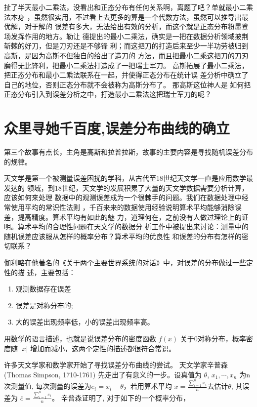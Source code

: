 扯了半天最小二乘法，没看出和正态分布有任何关系啊，离题了吧？单就最小二乘法本身
，虽然很实用，不过看上去更多的算是一个代数方法，虽然可以推导出最优解，对于解的
误差有多大，无法给出有效的分析，而这个就是正态分布粉墨登场发挥作用的地方。勒让
德提出的最小二乘法，确实是一把在数据分析领域披荆斩棘的好刀，但是刀刃还是不够锋
利；而这把刀的打造后来至少一半功劳被归到高斯，是因为高斯不但独自的给出了造刀的
方法，而且把最小二乘这把刀的刀刃磨得无比锋利，把最小二乘法打造成了一把瑞士军刀。
高斯拓展了最小二乘法，把正态分布和最小二乘法联系在一起，并使得正态分布在统计误
差分析中确立了自己的地位，否则正态分布就不会被称为高斯分布了。 那高斯这位神人是
如何把正态分布引入到误差分析之中，打造最小二乘法这把瑞士军刀的呢？

\section{众里寻她千百度,误差分布曲线的确立}

第三个故事有点长，主角是高斯和拉普拉斯，故事的主要内容是寻找随机误差分布的规律。

天文学是第一个被测量误差困扰的学科，从古代至18世纪天文学一直是应用数学最发达的
领域，到18世纪，天文学的发展积累了大量的天文学数据需要分析计算，应该如何来处理
数据中的观测误差成为一个很棘手的问题。我们在数据处理中经常使用平均的常识性法则
，千百来来的数据使用经验说明算术平均能够消除误差，提高精度。算术平均有如此的魅
力，道理何在，之前没有人做过理论上的证明。算术平均的合理性问题在天文学的数据分
析工作中被提出来讨论：测量中的随机误差应该服从怎样的概率分布？算术平均的优良性
和误差的分布有怎样的密切联系？

伽利略在他著名的《关于两个主要世界系统的对话》中，对误差的分布做过一些定性的描
述，主要包括：
\begin{enumerate}
\item 观测数据存在误差
\item 误差是对称分布的;
\item 大的误差出现频率低，小的误差出现频率高。
\end{enumerate}
用数学的语言描述，也就是说误差分布的密度函数 $f(x)$ 关于0对称分布，概率密度随
$|x|$ 增加而减小，这两个定性的描述都很符合常识。

许多天文学家和数学家开始了寻找误差分布曲线的尝试。 天文学家辛普森(Thomas
Simpson, 1710-1761) 先走出了有意义的一步。设真值为 $\theta$, $x_1, \cdots, x_n$
为n次测量值, 每次测量的误差为$ e_i = x_i - \theta $，若用算术平均 $\overline{x} =
\frac{\sum_{i=1}^n x_i}{n} $去估计$\theta$, 其误差为 $\overline{e} =
\frac{\sum_{i=1}^n e_i}{n} $。 辛普森证明了, 对于如下的一个概率分布，


